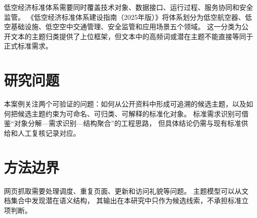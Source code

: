 \yibinopeningchapter

低空经济标准体系需要同时覆盖技术对象、数据接口、运行过程、服务协同和安全监管。
《低空经济标准体系建设指南（2025年版）》将体系划分为低空航空器、低空基础设施、低空空中交通管理、安全监管和应用场景五个领域。
这一分类为公开文本的主题归类提供了上位框架，但文本中的高频词或潜在主题不能直接等同于正式标准需求。

\section{研究问题}

本案例关注两个可验证的问题：如何从公开资料中形成可追溯的候选主题，以及如何把候选主题约束为可命名、可归类、可解释的标准化对象。
标准需求识别可借鉴“对象分解—需求识别—结构聚合”的工程思路，
但具体结论仍需与现有标准供给和人工复核记录对应。

\section{方法边界}

网页抓取需要处理调度、重复页面、更新和访问礼貌等问题。
主题模型可以从文档集合中发现潜在语义结构，
其输出在本研究中只作为候选线索，不承担标准立项判断。
